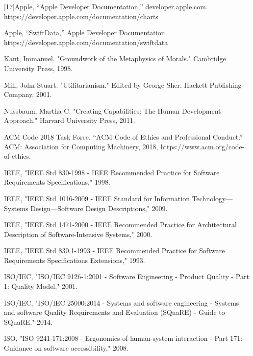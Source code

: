 \begin{thebibliography}{100}
     [17]Apple, “Apple Developer Documentation,” developer.apple.com. https://developer.apple.com/documentation/charts

     Apple, “SwiftData,” Apple Developer Documentation. https://developer.apple.com/documentation/swiftdata

     Kant, Immanuel. "Groundwork of the Metaphysics of Morals." Cambridge University Press, 1998.

     Mill, John Stuart. "Utilitarianism." Edited by George Sher. Hackett Publishing Company, 2001.

     Nussbaum, Martha C. "Creating Capabilities: The Human Development Approach." Harvard University Press, 2011.

     ACM Code 2018 Task Force. “ACM Code of Ethics and Professional Conduct.” ACM: Association for Computing Machinery, 2018, https://www.acm.org/code-of-ethics. 

     IEEE, "IEEE Std 830-1998 - IEEE Recommended Practice for Software Requirements Specifications," 1998.
    
     IEEE, "IEEE Std 1016-2009 - IEEE Standard for Information Technology—Systems Design—Software Design Descriptions," 2009.
    
     IEEE, "IEEE Std 1471-2000 - IEEE Recommended Practice for Architectural Description of Software-Intensive Systems," 2000.
    
     IEEE, "IEEE Std 830.1-1993 - IEEE Recommended Practice for Software Requirements Specifications Extensions," 1993.

     ISO/IEC, "ISO/IEC 9126-1:2001 - Software Engineering - Product Quality - Part 1: Quality Model," 2001.
    
     ISO/IEC, "ISO/IEC 25000:2014 - Systems and software engineering - Systems and software Quality Requirements and Evaluation (SQuaRE) - Guide to SQuaRE," 2014.
    
     ISO, "ISO 9241-171:2008 - Ergonomics of human-system interaction - Part 171: Guidance on software accessibility," 2008.

\end{thebibliography}